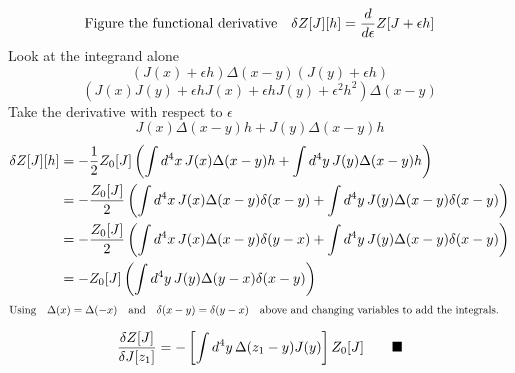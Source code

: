 \documentclass{memoir}
\begin{document}
\[\qq*{Figure the functional derivative}\var Z[J][h]=\dv{\epsilon}Z[J+\epsilon h]\]
Look at the integrand alone
\[(J(x)+\epsilon h) \Delta(x-y) (J(y)+\epsilon h)\]
\[(J(x)J(y)+\epsilon h J(x)+\epsilon h J(y)+\epsilon^2 h^2) \Delta(x-y)\]
Take the derivative with respect to $\epsilon$
\[J(x) \Delta(x-y)h + J(y) \Delta(x-y)h\]
\begin{align*}
    \var{ Z[J][h]} & =-\frac{1}{2}Z_0[J]\left(\int d^4 x\,  J(x) \Delta(x-y)h +\int d^4 y\,J(y) \Delta(x-y)h\right)                    \\
                   & =-\frac{Z_0[J]}{2}\left(\int d^4 x\,  J(x) \Delta(x-y)\delta(x-y) +\int d^4 y\,J(y) \Delta(x-y)\delta(x-y)\right) \\
                   & =-\frac{Z_0[J]}{2}\left(\int d^4 x\,  J(x) \Delta(x-y)\delta(y-x) +\int d^4 y\,J(y) \Delta(x-y)\delta(x-y)\right) \\
                   & =-Z_0[J]\left(\int d^4 y\,J(y) \Delta(y-x)\delta(x-y)\right)                                                      \\
\end{align*}
\[\qq*{Using}\Delta(x)=\Delta(-x)\qand \delta(x-y)=\delta(y-x)\qq{above and changing variables to add the integrals.}\]

\[\fdv{Z[J]}{J[z_1]}=-\left[\int d^4 y\, \Delta(z_1-y)J(y)\right]Z_0[J] \qquad \blacksquare\]
\end{document}
